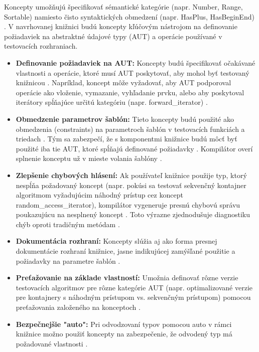 \documentclass[11pt]{article}
\begin{document}
\noindent Koncepty umožňujú špecifikovať sémantické kategórie (napr. Number, Range, Sortable) namiesto čisto syntaktických obmedzení (napr. HasPlus, HasBeginEnd) \cite{c++_stroustrup_tour}. V navrhovanej knižnici budú koncepty kľúčovým nástrojom na definovanie požiadaviek na abstraktné údajové typy (AUT) a operácie používané v testovacích rozhraniach.

\begin{itemize}
    \item \textbf{Definovanie požiadaviek na AUT:} Koncepty budú špecifikovať očakávané vlastnosti a operácie, ktoré musí AUT poskytovať, aby mohol byť testovaný knižnicou \cite{c++_stroustrup_tour}. Napríklad, koncept môže vyžadovať, aby AUT podporoval operácie ako vloženie, vymazanie, vyhľadanie prvku, alebo aby poskytoval iterátory spĺňajúce určitú kategóriu (napr. forward\_iterator) \cite{c++_stroustrup_tour}.
    \item \textbf{Obmedzenie parametrov šablón:} Tieto koncepty budú použité ako obmedzenia (constraints) na parametroch šablón v testovacích funkciách a triedach \cite{c++_stroustrup_tour}. Tým sa zabezpečí, že s komponentmi knižnice budú môcť byť použité iba tie AUT, ktoré spĺňajú definované požiadavky \cite{c++_stroustrup_tour}. Kompilátor overí splnenie konceptu už v mieste volania šablóny \cite{c++_stroustrup_tour}.
    \item \textbf{Zlepšenie chybových hlásení:} Ak používateľ knižnice použije typ, ktorý nespĺňa požadovaný koncept (napr. pokúsi sa testovať sekvenčný kontajner algoritmom vyžadujúcim náhodný prístup cez koncept random\_access\_iterator), kompilátor vygeneruje presnú chybovú správu poukazujúcu na nesplnený koncept \cite{c++_stroustrup_tour}. Toto výrazne zjednodušuje diagnostiku chýb oproti tradičným metódam \cite{c++_stroustrup_tour}.
    \item \textbf{Dokumentácia rozhraní:} Koncepty slúžia aj ako forma presnej dokumentácie rozhraní knižnice, jasne indikujúcej zamýšľané použitie a požiadavky na parametre šablón \cite{c++_stroustrup_tour}.
    \item \textbf{Preťažovanie na základe vlastností:} Umožnia definovať rôzne verzie testovacích algoritmov pre rôzne kategórie AUT (napr. optimalizované verzie pre kontajnery s náhodným prístupom vs. sekvenčným prístupom) pomocou preťažovania založeného na konceptoch \cite{c++_stroustrup_tour}.
    \item \textbf{Bezpečnejšie "auto":} Pri odvodzovaní typov pomocou auto v rámci knižnice možno použiť koncepty na zabezpečenie, že odvodený typ má požadované vlastnosti \cite{c++_stroustrup_tour}.
\end{itemize}
\end{document}
